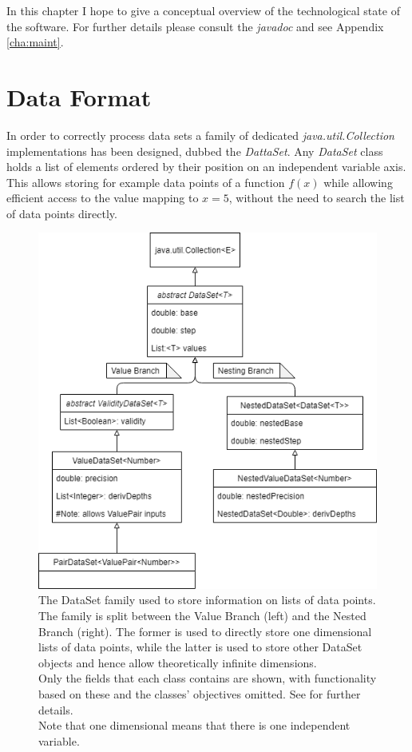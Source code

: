 \documentclass[main.tex]{subfiles}
\begin{document}
  
  In this chapter I hope to give a conceptual overview of the technological state of the software. For further details please consult the \textit{javadoc} and see Appendix \ref{cha:maint}.
  
  \section{Data Format}
    \label{sec:impl:data}
    
    In order to correctly process data sets a family of dedicated \textit{java.util.Collection} implementations has been designed, dubbed the \textit{DattaSet}. Any \textit{DataSet} class holds a list of elements ordered by their position on an independent variable axis. This allows storing for example data points of a function $f(x)$ while allowing efficient access to the value mapping to $x=5$, without the need to search the list of data points directly.
    
    \begin{figure}
      \centering
      \includegraphics[width=0.55\linewidth]{figures/dataSetFamily}
      \captionsetup{format=plain, indention=1.0cm}
      \caption{The DataSet family used to store information on lists of data points. The family is split between the Value Branch (left) and the Nested Branch (right). The former is used to directly store one dimensional lists of data points, while the latter is used to store other DataSet objects and hence allow theoretically infinite dimensions. \\
      Only the fields that each class contains are shown, with functionality based on these and the classes' objectives omitted. See  for further details. \\
      Note that one dimensional means that there is one independent variable.}
      \label{fig:dataSetFam}
    \end{figure}
    
\end{document}
